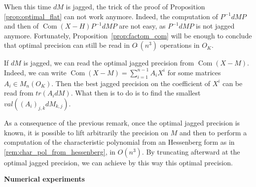 \documentclass{sig-alternate-05-2015}
\DeclareMathOperator{\com}{Com}
\newcommand{\softO}{O\tilde{~}}
\begin{document}
When this time $dM$ is jagged, the trick of the proof of Proposition
\ref{prop:optimal_flat} can not work anymore.
Indeed, the computation of $P^{-1}  dM P$ and then of $\com (X-H) P^{-1}  dM P$
are not easy, as $P^{-1}  dM P$ is not jagged anymore.
Fortunately, Proposition~\ref{prop:factom_com} will be enough to 
conclude that optimal precision can still be read in $\softO (n^3)$ 
operations in $O_K.$

\begin{rem}
If $dM$ is jagged, we can read the optimal
jagged precision from $\com (X-M).$
Indeed, we can write $\com (X-M)=\sum_{i=1}^{n-1} A_i X^i$
for some matrices $A_i \in M_n(O_K).$
Then the best jagged precision on the coefficient of 
$X^i$ can be read from $tr (A_i dM).$
What then is to do is to find the smallest 
$val((A_i)_{j,k} dM_{k,j}).$
\end{rem}

\begin{rem}
As a consequence of the previous remark, once the optimal jagged
precision is known, it is possible to lift arbitrarily
the precision on $M$ and then to perform
a computation of the characteristic polynomial
from an Hessenberg form as in \ref{rem:char_pol_from_hessenberg},
in $O(n^3).$
By truncating afterward at the optimal jagged precision,
we can achieve by this way this optimal precision.
\end{rem}

\noindent
{\bf Numerical experiments}
\end{document}
